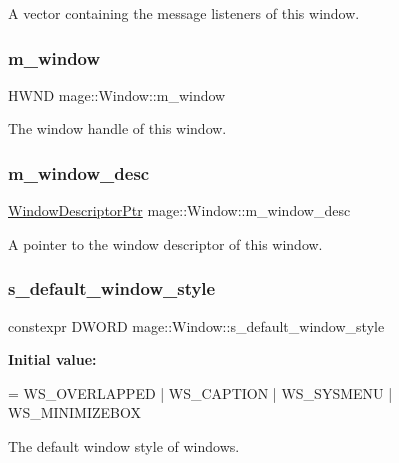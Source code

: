 A vector containing the message listeners of this window. \mbox{\label{classmage_1_1_window_a5ca72a18801ff9e6abc309949d7b08b4}} 
\subsubsection{\texorpdfstring{m\+\_\+window}{m\_window}}
{\footnotesize\ttfamily H\+W\+ND mage\+::\+Window\+::m\+\_\+window\hspace{0.3cm}{\ttfamily [private]}}

The window handle of this window. \mbox{\label{classmage_1_1_window_a51bbea46f4590a68d384d0b8d14e0cd8}} 
\subsubsection{\texorpdfstring{m\+\_\+window\+\_\+desc}{m\_window\_desc}}
{\footnotesize\ttfamily \mbox{\hyperlink{classmage_1_1_window_ac41b052d8e8dd0571b3ec862e8f6da05}{Window\+Descriptor\+Ptr}} mage\+::\+Window\+::m\+\_\+window\+\_\+desc\hspace{0.3cm}{\ttfamily [private]}}

A pointer to the window descriptor of this window. \mbox{\label{classmage_1_1_window_ac680bdd3d5359f66b2dea082ef45e0da}} 
\subsubsection{\texorpdfstring{s\+\_\+default\+\_\+window\+\_\+style}{s\_default\_window\_style}}
{\footnotesize\ttfamily constexpr D\+W\+O\+RD mage\+::\+Window\+::s\+\_\+default\+\_\+window\+\_\+style\hspace{0.3cm}{\ttfamily [static]}}

{\bfseries Initial value\+:}
\begin{DoxyCode}
= WS\_OVERLAPPED
                                                      | WS\_CAPTION
                                                      | WS\_SYSMENU
                                                      | WS\_MINIMIZEBOX
\end{DoxyCode}
The default window style of windows. 